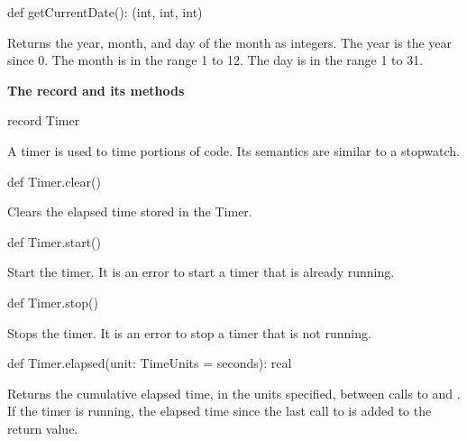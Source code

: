 \begin{chapel}
def getCurrentDate(): (int, int, int)
\end{chapel}
Returns the year, month, and day of the month as integers.  The year
is the year since 0.  The month is in the range 1 to 12.  The day is
in the range 1 to 31.

{\bf The  record and its methods}

\begin{chapel}
record Timer
\end{chapel}
A timer is used to time portions of code.  Its semantics are similar
to a stopwatch.

\begin{chapel}
def Timer.clear()
\end{chapel}
Clears the elapsed time stored in the Timer.

\begin{chapel}
def Timer.start()
\end{chapel}
Start the timer.  It is an error to start a timer that is already
running.

\begin{chapel}
def Timer.stop()
\end{chapel}
Stops the timer.  It is an error to stop a timer that is not running.

\begin{chapel}
def Timer.elapsed(unit: TimeUnits = seconds): real
\end{chapel}
Returns the cumulative elapsed time, in the units specified, between
calls to  and .  If the timer is running, the
elapsed time since the last call to  is added to the
return value.

